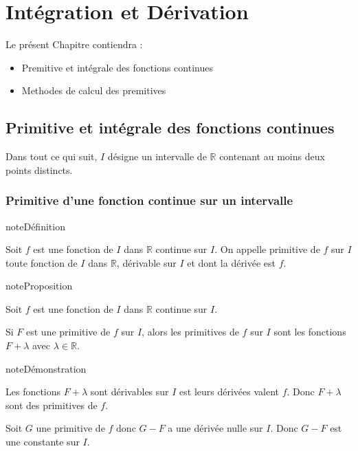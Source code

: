 \documentclass[letterpaper,10pt,french]{sphinxmanual}
\begin{document}
\chapter{Intégration et Dérivation}
\label{\detokenize{integrationd:integration-et-derivation}}\label{\detokenize{integrationd::doc}}
\sphinxAtStartPar
Le présent Chapitre contiendra :
\begin{itemize}
\item {} 
\sphinxAtStartPar
Premitive et intégrale des fonctions continues

\item {} 
\sphinxAtStartPar
Methodes de calcul des premitives

\end{itemize}


\section{Primitive et intégrale des fonctions continues}
\label{\detokenize{pintfc:primitive-et-integrale-des-fonctions-continues}}\label{\detokenize{pintfc::doc}}
\sphinxAtStartPar
Dans tout ce qui suit, \(I\) désigne un intervalle de \(\mathbb R\) contenant au moins deux points distincts.


\subsection{Primitive d’une fonction continue sur un intervalle}
\label{\detokenize{pintfc:primitive-d-une-fonction-continue-sur-un-intervalle}}
\begin{sphinxadmonition}{note}{Définition}

\sphinxAtStartPar
Soit \(f\) est une fonction de \(I\) dans \(\mathbb R\) continue sur \(I\). On appelle primitive de \(f\) sur \(I\) toute fonction de \(I\) dans \(\mathbb R\), dérivable sur \(I\) et dont la dérivée est \(f\).
\end{sphinxadmonition}

\begin{sphinxadmonition}{note}{Proposition}

\sphinxAtStartPar
Soit \(f\) est une fonction de \(I\) dans \(\mathbb R\) continue sur \(I\).

\sphinxAtStartPar
Si \(F\) est une primitive de \(f\) sur \(I\), alors les primitives de \(f\) sur \(I\) sont les fonctions \(F+\lambda\) avec \(\lambda \in \mathbb R\).
\end{sphinxadmonition}

\begin{sphinxadmonition}{note}{Démonstration}

\sphinxAtStartPar
Les fonctions \(F+\lambda\) sont dérivables sur \(I\) est leurs dérivées valent \(f\). Donc \(F+\lambda\) sont des primitives de \(f\).

\sphinxAtStartPar
Soit \(G\) une primitive de \(f\) donc \(G-F\) a une dérivée nulle sur \(I\). Donc \(G-F\) est une constante sur \(I\).
\end{sphinxadmonition}
\end{document}
